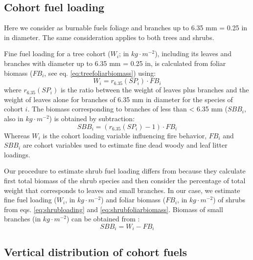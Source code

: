\documentclass[]{book}
\begin{document}
\hypertarget{cohort-fuel-loading}{%
\subsection{Cohort fuel loading}\label{cohort-fuel-loading}}

Here we consider as burnable fuels foliage and branches up to 6.35 mm = 0.25 in in diameter. The same consideration applies to both trees and shrubs.

Fine fuel loading for a tree cohort (\(W_{i}\); in \(kg\cdot m^{-2}\)), including its leaves and branches with diameter up to 6.35 mm = 0.25 in, is calculated from foliar biomass (\(FB_{i}\), see eq. \eqref{eq:treefoliarbiomass}) using:
\begin{equation}
W_{i} = r_{6.35}(SP_i)\cdot FB_{i}
\end{equation}
where \(r_{6.35}(SP_i)\) is the ratio between the weight of leaves plus branches and the weight of leaves alone for branches of 6.35 mm in diameter for the species of cohort \(i\). The biomass corresponding to branches of less than \textless{} 6.35 mm (\(SBB_{i}\), also in \(kg\cdot m^{-2}\)) is obtained by subtraction:
\begin{equation}
SBB_{i} = (r_{6.35}(SP_i)-1)\cdot FB_{i}
\end{equation}
Whereas \(W_{i}\) is the cohort loading variable influencing fire behavior, \(FB_{i}\) and \(SBB_{i}\) are cohort variables used to estimate fine dead woody and leaf litter loadings.

Our procedure to estimate shrub fuel loading differs from \citet{Prichard2013} because they calculate first total biomass of the shrub species and then consider the percentage of total weight that corresponds to leaves and small branches. In our case, we estimate fine fuel loading (\(W_{i}\), in \(kg \cdot m^{-2}\)) and foliar biomass (\(FB_i\), in \(kg \cdot m^{-2}\)) of shrubs from eqs. \eqref{eq:shrubloading} and \eqref{eq:shrubfoliarbiomass}. Biomass of small branches (in \(kg \cdot m^{-2}\)) can be obtained from :
\begin{equation}
SBB_{i} = W_{i} - FB_{i}
\end{equation}

\hypertarget{vertical-distribution-of-cohort-fuels}{%
\subsection{Vertical distribution of cohort fuels}\label{vertical-distribution-of-cohort-fuels}}
\end{document}
